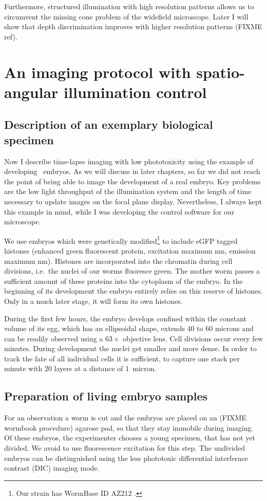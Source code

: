 Furthermore, structured illumination with high resolution patterns
allows us to circumvent the missing cone problem of the widefield
microscope.  Later I will show that depth discrimination improves with
higher resolution patterns (FIXME ref).
\section{An imaging protocol with spatio-angular illumination control}
\subsection{Description of an exemplary biological specimen} 
Now I describe time-lapse imaging with low phototoxicity using the
example of developing \celegans\ embryos. As we will discuss in later
chapters, so far we did not reach the point of being able to image the
development of a real embryo. Key problems are the low light
throughput of the illumination system and the length of time necessary
to update images on the focal plane display. Nevertheless, I always
kept this example in mind, while I was developing the control software
for our microscope.

We use embryos which were genetically modified\footnote{Our strain has
WormBase ID AZ212 \citep{Praitis2001}.}  to include eGFP tagged histones (enhanced green
fluorescent protein, excitation maximum \unit[488]{nm}, emission
maximum \unit[509]{nm}). Histones are incorporated into the chromatin
during cell divisions, i.e.\ the nuclei of our worms fluoresce green.
The mother worm passes a sufficient amount of these proteins into the
cytoplasm of the embryo. In the beginning of its development the
embryo entirely relies on this reserve of histones. Only
in a much later stage, it will form its own histones.

During the first few hours, the embryo develops confined within the
constant volume of its egg, which has an ellipsoidal shape, extends 40
to 60 microns and can be readily observed using a $63\times$ objective
lens. Cell divisions occur every few minutes.  During development the
nuclei get smaller and more dense. In order to track the fate of all
individual cells it is sufficient, to capture one stack per minute
with 20 layers at a distance of 1~micron.
\subsection{Preparation of living embryo samples} 
For an observation a worm is cut and the embryos are placed on an
(FIXME wormbook procedure) agarose pad, so that they stay immobile
during imaging. Of these embryos, the experimenter chooses a young
specimen, that has not yet divided. We avoid to use fluorescence
excitation for this step.  The undivided embryos can be distinguished
using the less phototoxic differential interfernce contrast (DIC)
imaging mode.

